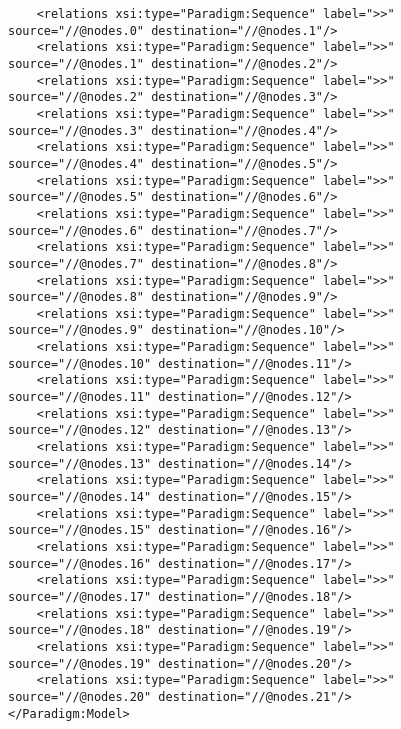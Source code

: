 \begin{lstlisting}
	<relations xsi:type="Paradigm:Sequence" label=">>" source="//@nodes.0" destination="//@nodes.1"/>
	<relations xsi:type="Paradigm:Sequence" label=">>" source="//@nodes.1" destination="//@nodes.2"/>
	<relations xsi:type="Paradigm:Sequence" label=">>" source="//@nodes.2" destination="//@nodes.3"/>
	<relations xsi:type="Paradigm:Sequence" label=">>" source="//@nodes.3" destination="//@nodes.4"/>
	<relations xsi:type="Paradigm:Sequence" label=">>" source="//@nodes.4" destination="//@nodes.5"/>
	<relations xsi:type="Paradigm:Sequence" label=">>" source="//@nodes.5" destination="//@nodes.6"/>
	<relations xsi:type="Paradigm:Sequence" label=">>" source="//@nodes.6" destination="//@nodes.7"/>
	<relations xsi:type="Paradigm:Sequence" label=">>" source="//@nodes.7" destination="//@nodes.8"/>
	<relations xsi:type="Paradigm:Sequence" label=">>" source="//@nodes.8" destination="//@nodes.9"/>
	<relations xsi:type="Paradigm:Sequence" label=">>" source="//@nodes.9" destination="//@nodes.10"/>
	<relations xsi:type="Paradigm:Sequence" label=">>" source="//@nodes.10" destination="//@nodes.11"/>
	<relations xsi:type="Paradigm:Sequence" label=">>" source="//@nodes.11" destination="//@nodes.12"/>
	<relations xsi:type="Paradigm:Sequence" label=">>" source="//@nodes.12" destination="//@nodes.13"/>
	<relations xsi:type="Paradigm:Sequence" label=">>" source="//@nodes.13" destination="//@nodes.14"/>
	<relations xsi:type="Paradigm:Sequence" label=">>" source="//@nodes.14" destination="//@nodes.15"/>
	<relations xsi:type="Paradigm:Sequence" label=">>" source="//@nodes.15" destination="//@nodes.16"/>
	<relations xsi:type="Paradigm:Sequence" label=">>" source="//@nodes.16" destination="//@nodes.17"/>
	<relations xsi:type="Paradigm:Sequence" label=">>" source="//@nodes.17" destination="//@nodes.18"/>
	<relations xsi:type="Paradigm:Sequence" label=">>" source="//@nodes.18" destination="//@nodes.19"/>
	<relations xsi:type="Paradigm:Sequence" label=">>" source="//@nodes.19" destination="//@nodes.20"/>
	<relations xsi:type="Paradigm:Sequence" label=">>" source="//@nodes.20" destination="//@nodes.21"/>
</Paradigm:Model>

\end{lstlisting}